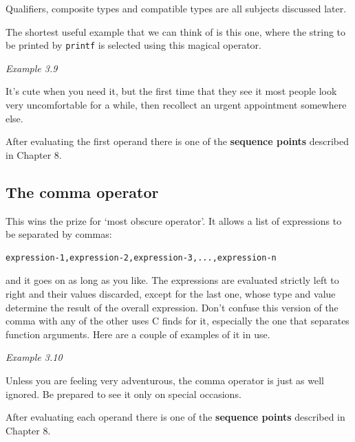    Qualifiers, composite types and compatible types are all subjects
    discussed later.


   The shortest useful example that we can think of is this one, where the
    string to be printed by \texttt{printf} is selected using this magical
    operator.


   \begin{center}\textit{Example 3.9}\end{center}


   It's cute when you need it, but the first time that they see it most
    people look very uncomfortable for a while, then recollect an urgent
    appointment somewhere else.


   After evaluating the first operand there is one of the \textbf{sequence
    points} described in Chapter 8.



  

  \subsection{The comma operator}
   

   This wins the prize for `most obscure operator'. It allows a list
    of expressions to be separated by commas:


   \begin{Verbatim}
expression-1,expression-2,expression-3,...,expression-n
\end{Verbatim}

   and it goes on as long as you like. The expressions are
    evaluated strictly left to right and their values discarded, except for
    the last one, whose type and value determine the result of the overall
    expression. Don't confuse this version of the comma with any of the other
    uses C finds for it, especially the one that separates function arguments.
    Here are a couple of examples of it in use.


   \begin{center}\textit{Example 3.10}\end{center}


   Unless you are feeling very adventurous, the comma operator is just as
    well ignored. Be prepared to see it only on special occasions.


   After evaluating each operand there is one of the \textbf{sequence
    points} described in Chapter 8.


